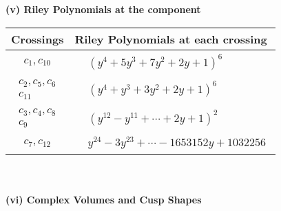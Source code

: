 \documentclass[1p]{elsarticle_modified}
\theoremstyle{definition}
\begin{document}
\newpage\renewcommand{\arraystretch}{1}
\flushleft \textbf{(v) Riley Polynomials at the component}\newline \\
\begin{tabular}{m{50pt}|m{274pt}}
Crossings & \hspace{64pt}Riley Polynomials at each crossing \\
\hline $$\begin{aligned}c_{1},c_{10}\end{aligned}$$&$\begin{aligned}
&(y^4+5 y^3+7 y^2+2 y+1)^6
\end{aligned}$\\
\hline $$\begin{aligned}c_{2},c_{5},c_{6}\\c_{11}\end{aligned}$$&$\begin{aligned}
&(y^4+y^3+3 y^2+2 y+1)^6
\end{aligned}$\\
\hline $$\begin{aligned}c_{3},c_{4},c_{8}\\c_{9}\end{aligned}$$&$\begin{aligned}
&(y^{12}- y^{11}+\cdots+2 y+1)^{2}
\end{aligned}$\\
\hline $$\begin{aligned}c_{7},c_{12}\end{aligned}$$&$\begin{aligned}
&y^{24}-3 y^{23}+\cdots-1653152 y+1032256
\end{aligned}$\\
\hline
\end{tabular}\\~\\
\newpage\flushleft \textbf{(vi) Complex Volumes and Cusp Shapes}
\end{document}
